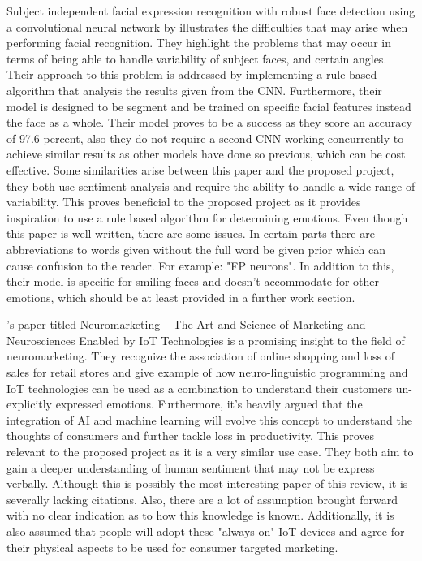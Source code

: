 Subject independent facial expression recognition with robust face detection using a convolutional neural network by \citeauthor{MATSUGU} illustrates the difficulties that may arise when performing facial recognition. They highlight the problems that may occur in terms of being able to handle variability of subject faces, and certain angles. Their approach to this problem is addressed by implementing a rule based algorithm that analysis the results given from the CNN. Furthermore, their model is designed to be segment and be trained on specific facial features instead the face as a whole. Their model proves to be a success as they score an accuracy of 97.6 percent, also they do not require a second CNN working concurrently to achieve similar results as other models have done so previous, which can be cost effective. Some similarities arise between this paper and the proposed project, they both use sentiment analysis and require the ability to handle a wide range of variability. This proves beneficial to the proposed project as it provides inspiration to use a rule based algorithm for determining emotions. Even though this paper is well written, there are some issues. In certain parts there are abbreviations to words given without the full word be given prior which can cause confusion to the reader. For example: "FP neurons". In addition to this, their model is specific for smiling faces and doesn't accommodate for other emotions, which should be at least provided in a further work section. 

\citeauthor{arthmann}'s paper titled Neuromarketing – The Art and Science of Marketing and Neurosciences Enabled by IoT Technologies is a promising insight to the field of neuromarketing. They recognize the association of online shopping and loss of sales for retail stores and give example of how neuro-linguistic programming and IoT technologies can be used as a combination to understand their customers un-explicitly expressed emotions. Furthermore, it's heavily argued that the integration of AI and machine learning will evolve this concept to understand the thoughts of consumers and further tackle loss in productivity. This proves relevant to the proposed project as it is a very similar use case. They both aim to gain a deeper understanding of human sentiment that may not be express verbally. Although this is possibly the most interesting paper of this review, it is severally lacking citations. Also, there are a lot of assumption brought forward with no clear indication as to how this knowledge is known. Additionally, it is also assumed that people will adopt these "always on" IoT devices and agree for their physical aspects to be used for consumer targeted marketing.
 
